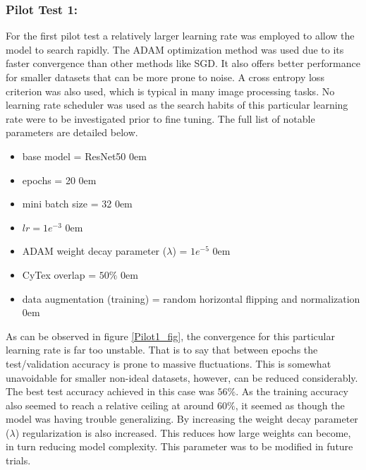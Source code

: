 \subsubsection{Pilot Test 1:}
For the first pilot test a relatively larger learning rate was employed to allow the model to search rapidly. The ADAM optimization method was used due to its faster convergence than other methods like SGD. It also offers better performance for smaller datasets that can be more prone to noise. A cross entropy loss criterion was also used, which is typical in many image processing tasks. No learning rate scheduler was used as the search habits of this particular learning rate were to be investigated prior to fine tuning. The full list of notable parameters are detailed below.
\begin{itemize}
    \item base model = ResNet50
    \itemsep0em
    \item epochs = 20
    \itemsep0em
    \item mini batch size = 32
    \itemsep0em
    \item $lr = 1e^{-3}$
    \itemsep0em
    \item ADAM weight decay parameter ($\lambda$) = $1e^{-5}$
    \itemsep0em
    \item CyTex overlap = $50\%$
    \itemsep0em
    \item data augmentation (training) = random horizontal flipping and normalization
    \itemsep0em
\end{itemize}
As can be observed in figure \ref{Pilot1_fig}, the convergence for this particular learning rate is far too unstable. That is to say that between epochs the test/validation accuracy is prone to massive fluctuations. This is somewhat unavoidable for smaller non-ideal datasets, however, can be reduced considerably. The best test accuracy achieved in this case was $56\%$. As the training accuracy also seemed to reach a relative ceiling at around $60\%$, it seemed as though the model was having trouble generalizing. By increasing the weight decay parameter ($\lambda$) regularization is also increased. This reduces how large weights can become, in turn reducing model complexity. This parameter was to be modified in future trials.
